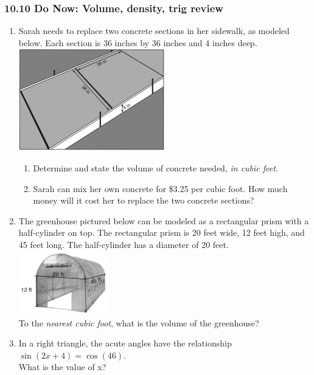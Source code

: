 \documentclass[12pt, twoside]{article}
\begin{document}
\subsubsection*{10.10 Do Now: Volume, density, trig review}
 \begin{enumerate}
    \item Sarah needs to replace two concrete sections in her sidewalk, as modeled below. Each section is 36 inches by 36 inches and 4 inches deep.\\[0.5cm]
    \includegraphics[width=0.5\textwidth]{walk_Aug2018-31.png}
      \begin{enumerate}
        \item Determine and state the volume of concrete needed, \emph{in cubic feet}. \vspace{1cm}
        \item Sarah can mix her own concrete for \$3.25 per cubic foot. How much money will it cost her to replace the two concrete sections?
    \end{enumerate} \vspace{2.5cm}

    \item The greenhouse pictured below can be modeled as a rectangular prism with a half-cylinder on top. The rectangular prism is 20 feet wide, 12 feet high, and 45 feet long. The half-cylinder has a diameter of 20 feet.\\[0.5cm]
    \includegraphics[width=0.3\textwidth]{greenhouse_Jun2018-7.png}\\
    To the \emph{nearest cubic foot}, what is the volume of the greenhouse?

\newpage
  \item In a right triangle, the acute angles have the relationship $\sin (2x+4)=\cos(46)$.\\[0.25cm]
    What is the value of x? \vspace{3cm}


\end{enumerate}
\end{document}
